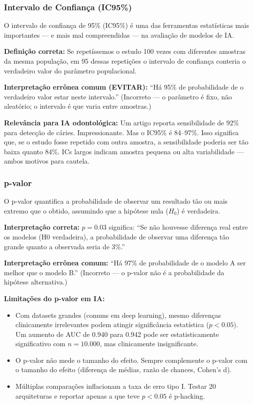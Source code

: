 \subsubsection{Intervalo de Confiança (IC95\%)}

O intervalo de confiança de 95\% (IC95\%)  é uma das ferramentas estatísticas mais importantes — e mais mal compreendidas — na avaliação de modelos de IA.

\textbf{Definição correta:} Se repetíssemos o estudo 100 vezes com diferentes amostras da mesma população, em 95 dessas repetições o intervalo de confiança conteria o verdadeiro valor do parâmetro populacional.

\textbf{Interpretação errônea comum (EVITAR):} ``Há 95\% de probabilidade de o verdadeiro valor estar neste intervalo.'' (Incorreto — o parâmetro é fixo, não aleatório; o intervalo é que varia entre amostras.)

\textbf{Relevância para IA odontológica:} Um artigo reporta sensibilidade de 92\% para detecção de cáries. Impressionante. Mas o IC95\% é 84--97\%. Isso significa que, se o estudo fosse repetido com outra amostra, a sensibilidade poderia ser tão baixa quanto 84\%. ICs largos indicam amostra pequena ou alta variabilidade — ambos motivos para cautela.

\subsubsection{p-valor}

O p-valor  quantifica a probabilidade de observar um resultado tão ou mais extremo que o obtido, assumindo que a hipótese nula ($H_0$) é verdadeira.

\textbf{Interpretação correta:} $p = 0.03$ significa: ``Se não houvesse diferença real entre os modelos (H0 verdadeira), a probabilidade de observar uma diferença tão grande quanto a observada seria de 3\%.''

\textbf{Interpretação errônea comum:} ``Há 97\% de probabilidade de o modelo A ser melhor que o modelo B.'' (Incorreto — o p-valor não é a probabilidade da hipótese alternativa.)

\textbf{Limitações do p-valor em IA:}
\begin{itemize}
    \item Com datasets grandes (comuns em deep learning), mesmo diferenças clinicamente irrelevantes podem atingir significância estatística ($p < 0.05$). Um aumento de AUC de 0.940 para 0.942 pode ser estatisticamente significativo com $n = 10.000$, mas clinicamente insignificante.
    \item O p-valor não mede o tamanho do efeito. Sempre complemente o p-valor com o tamanho do efeito (diferença de médias, razão de chances, Cohen's d).
    \item Múltiplas comparações inflacionam a taxa de erro tipo I. Testar 20 arquiteturas e reportar apenas a que teve $p < 0.05$ é p-hacking.
\end{itemize}

